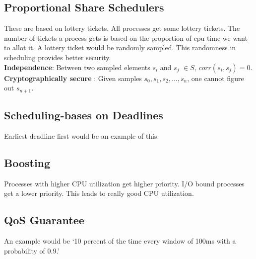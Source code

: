 \documentclass[twoside]{article}
\begin{document}
\subsection{Proportional Share Schedulers}
These are based on lottery tickets. All processes get some lottery tickets. The number of tickets a process gets is based on the proportion of  cpu time we want to allot it. A lottery ticket would be randomly sampled. This randomness in scheduling provides better security. \\
\textbf{Independence}: Between two sampled elements $s_i$ and  $s_j$  $\in  S$, $corr(s_i ,s_j) = 0 $.
\textbf{Cryptographically secure }: Given samples $s_0,  s_1, s_2,...,s_n$, one cannot figure out $s_{n+1}$. 
\subsection{Scheduling-bases on Deadlines} 
Earliest deadline first would be an example of this. 
\subsection{Boosting}  
Processes with higher CPU utilization get higher priority. I/O bound processes get a lower priority. This leads to really good CPU utilization.
\subsection{QoS Guarantee} An example would be `10 percent of the time every window of 100ms with a probability of 0.9.'
\end{document}
